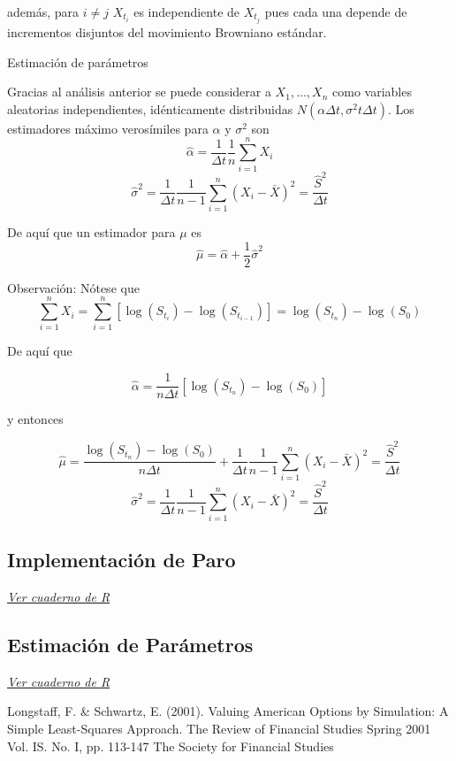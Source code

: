 \documentclass[12pt,reqno,letter]{article}
\begin{document}
	además, para $i\neq j$ $X_{t_i}$ es independiente de $X_{t_j}$ pues cada una depende de incrementos disjuntos del movimiento Browniano estándar.
	
	Estimación de parámetros
	
	Gracias al análisis anterior se puede considerar a $X_1,\ldots,X_n$ como variables aleatorias independientes, idénticamente distribuidas $N(\alpha\Delta t,\sigma^2t \Delta t)$. Los estimadores máximo verosímiles para $\alpha$ y $\sigma^2$ son
	$$\widehat{\alpha}=\frac{1}{\Delta t}\frac{1}{n}\sum_{i=1}^n X_i$$
	$$\widehat{\sigma}^2 = \frac{1}{\Delta t}\frac{1}{n-1}\sum_{i=1}^n(X_i-\bar{X})^2=\frac{\widehat{S}^2}{\Delta t}$$
	
	De aquí que un estimador para $\mu$ es
	$$\widehat{\mu} = \widehat{\alpha} + \frac{1}{2}\widehat{\sigma}^2$$
	
	Observación:
	Nótese que 
	$$\sum_{i=1}^n X_i = \sum_{i=1}^n [\log(S_{t_i})-\log(S_{t_{i-1}})]=\log(S_{t_n})-\log(S_0)$$
	
	De aquí que
	
	$$\widehat{\alpha}=\frac{1}{n\Delta t}[\log(S_{t_n})-\log(S_0)]$$
	
	y entonces
	
	$$\widehat{\mu} =\frac{\log(S_{t_n})-\log(S_0)}{n\Delta t}+ \frac{1}{\Delta t}\frac{1}{n-1}\sum_{i=1}^n(X_i-\bar{X})^2=\frac{\widehat{S}^2}{\Delta t}$$
	$$\widehat{\sigma}^2 = \frac{1}{\Delta t}\frac{1}{n-1}\sum_{i=1}^n(X_i-\bar{X})^2=\frac{\widehat{S}^2}{\Delta t}$$
	
	\subsection{Implementación de Paro}
	
	\textit{\href{https://www.dropbox.com/s/pfarddbjlv2tc5z/implementacion_paro.pdf?dl=0}{Ver cuaderno de R}}
	
	\subsection{Estimación de Parámetros}
	
	\textit{\href{https://www.dropbox.com/s/njszo4jprkzxhz6/estimacion_parametros_edp.pdf?dl=0}{Ver cuaderno de R}}
	

	\begin{thebibliography}{9}
			 Longstaff, F. \& Schwartz, E. (2001). Valuing American Options by Simulation: A Simple Least-Squares Approach. The Review of Financial Studies Spring 2001 Vol. IS. No. I, pp. 113-147 The Society for Financial Studies
	\end{thebibliography}
	
	
	
\end{document}
